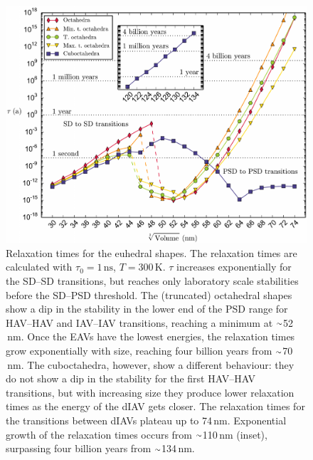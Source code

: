 \documentclass[review,authoryear]{elsarticle}
\newcommand{\roughly}{{\raise.17ex\hbox{$\scriptstyle\sim$}}}
\newcommand{\nm}{\,\text{nm}}
\begin{document}
\begin{figure}[ht]
\centering
\includegraphics[width=\textwidth]{Figure_09.pdf}
\caption{Relaxation times for the euhedral shapes. The relaxation times are calculated with $\tau_0=1\,\text{ns}$, $T=300\,\text{K}$. $\tau$ increases exponentially for the SD--SD transitions, but reaches only laboratory scale stabilities before the SD--PSD threshold. The (truncated) octahedral shapes show a dip in the stability in the lower end of the PSD range for HAV--HAV and IAV--IAV transitions, reaching a minimum at $\roughly$52$\nm$. Once the EAVs have the lowest energies, the relaxation times grow exponentially with size, reaching four billion years from $\roughly$70$\nm$. The cuboctahedra, however, show a different behaviour: they do not show a dip in the stability for the first HAV--HAV transitions, but with increasing size they produce lower relaxation times as the energy of the dIAV gets closer. The relaxation times for the transitions between dIAVs plateau up to 74$\nm$. Exponential growth of the relaxation times occurs from $\roughly$110$\nm$ (inset), surpassing four billion years from $\roughly$134$\nm$.}
\label{fig9}
\end{figure}
\end{document}
